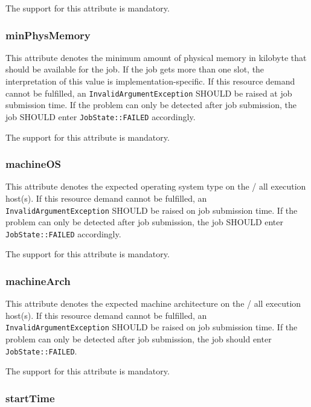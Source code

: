 \documentclass{article}
\newcommand{\h}[1]{\lstinline|#1|}
\newcommand{\rat}[1]{}
\begin{document}
The support for this attribute is mandatory.

\subsubsection{minPhysMemory}

This attribute denotes the minimum amount of physical memory in kilobyte that should be available for the job. If the job gets more than one slot, the interpretation of this value is implementation-specific. If this resource demand cannot be fulfilled, an \h{InvalidArgumentException} SHOULD be raised at job submission time. If the problem can only be detected after job submission, the job SHOULD enter \h{JobState::FAILED} accordingly.

The support for this attribute is mandatory.

\subsubsection{machineOS}

This attribute denotes the expected operating system type on the / all execution host(s). If this resource demand cannot be fulfilled, an \h{InvalidArgumentException} SHOULD be raised on job submission time. If the problem can only be detected after job submission, the job SHOULD enter \h{JobState::FAILED} accordingly.

The support for this attribute is mandatory.

\rat{
Requesting a specific operating system version beyond the type is not supported by the majority of DRM systems (conf call Jul 28th 2010)
}

\subsubsection{machineArch}

This attribute denotes the expected machine architecture on the / all execution host(s). If this resource demand cannot be fulfilled, an \h{InvalidArgumentException} SHOULD be raised on job submission time. If the problem can only be detected after job submission, the job should enter \h{JobState::FAILED}. 

The support for this attribute is mandatory.

\subsubsection{startTime}
\end{document}
